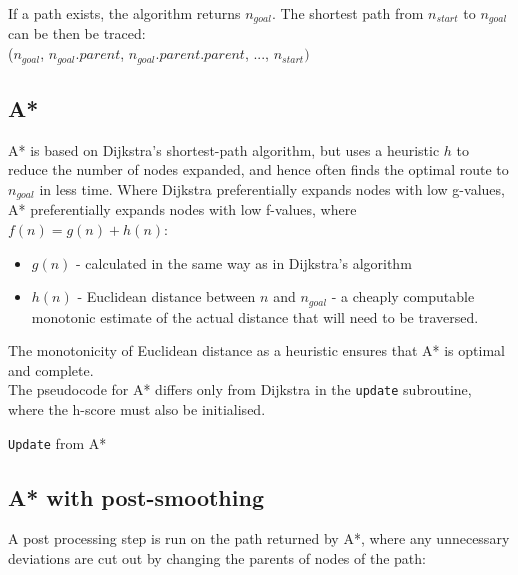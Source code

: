\documentclass[12pt,twoside,notitlepage]{report}
\begin{document}
\noindent
If a path exists, the algorithm returns $n_{goal}$. The shortest path from {$n_{start}$} to {$n_{goal}$} can be then be traced: \\({$n_{goal}$}, {$n_{goal}.parent$}, {$n_{goal}.parent.parent$}, ..., {$n_{start})$}

\subsection {A*}

A* is based on Dijkstra's shortest-path algorithm, but uses a heuristic {$h$} to reduce the number of nodes expanded, and hence often finds the optimal route to {$n_{goal}$} in less time. Where Dijkstra preferentially expands nodes with low g-values, A* preferentially expands nodes with low f-values, where {$f(n) = g(n) + h(n)$}: 
\begin{itemize}
\item {\em {$g(n)$}} - calculated in the same way as in Dijkstra's algorithm
\item {\em {$h(n)$}} - Euclidean distance between {$n$} and {$n_{goal}$}  - a cheaply computable monotonic estimate of the actual distance that will need to be traversed.
\end{itemize}
The monotonicity of Euclidean distance as a heuristic ensures that A* is optimal and complete. \\

\noindent
The pseudocode for A* differs only from Dijkstra in the {\tt update} subroutine, where the h-score must also be initialised.

\begin{algorithm}[htp]
  \SetAlgoLined\DontPrintSemicolon
  \caption{{\tt Update} from {\sc A*}}
\end{algorithm} 

\subsection {A* with post-smoothing}

A post processing step is run on the path returned by A*, where any unnecessary deviations are cut out by changing the parents of nodes of the path:
\end{document}
